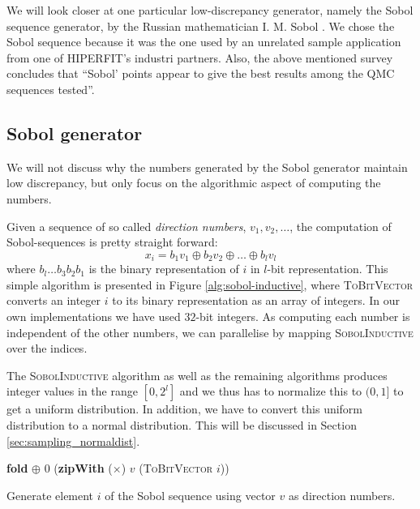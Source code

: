 We will look closer at one particular low-discrepancy generator,
namely the Sobol sequence generator, by the Russian mathematician
I. M. Sobol \cite{sobol1967}. We chose the Sobol sequence because it
was the one used by an unrelated sample application from one of
HIPERFIT's industri partners. Also, the above mentioned survey
concludes that ``Sobol' points appear to give the best results among
the QMC sequences tested''.

\subsection{Sobol generator}
\label{sec:sobol}
We will not discuss why the numbers generated by the Sobol generator
maintain low discrepancy, but only focus on the algorithmic aspect of
computing the numbers.

Given a sequence of so called \emph{direction numbers}, $v_1, v_2,
\ldots$, the computation of Sobol-sequences is pretty straight forward:
$$x_i = b_1v_1 \oplus b_2v_2 \oplus \ldots \oplus b_lv_l$$
where $b_l\ldots b_3b_2b_1$ is the binary representation of $i$ in
$l$-bit representation. This simple algorithm is presented in Figure
\ref{alg:sobol-inductive}, where \textsc{ToBitVector} converts an
integer $i$ to its binary representation as an array of integers. In
our own implementations we have used $32$-bit integers. As computing
each number is independent of the other numbers, we can parallelise by
mapping \textsc{SobolInductive} over the indices.

The \textsc{SobolInductive} algorithm as well as the remaining
algorithms produces integer values in the range $[0, 2^l]$ and we thus
has to normalize this to $(0,1]$ to get a uniform distribution. In
addition, we have to convert this uniform distribution to a normal
distribution. This will be discussed in Section
\ref{sec:sampling_normaldist}.

\begin{algorithm}
  \begin{algorithmic}
    \State \Return \textbf{fold} $\oplus$ 0 (\textbf{zipWith} ($\times$) $v$ (\textsc{ToBitVector} $i$))
    \EndFunction
  \end{algorithmic}
  \caption{Generate element $i$ of the Sobol sequence using vector
    $v$ as direction numbers.}
  \label{alg:sobol-inductive}
\end{algorithm}


